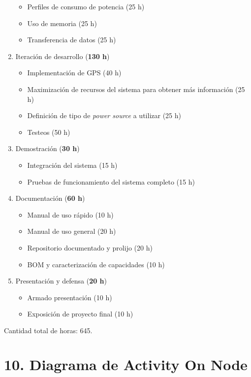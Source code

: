 \documentclass[
11pt, %
codirector, %
]{charter}
\begin{document}
\begin{enumerate}
\begin{itemize}
			\item Perfiles de consumo de potencia (25 h)
			\item Uso de memoria (25 h)
			\item Transferencia de datos (25 h)		
		\end{itemize}
	\item Iteración de desarrollo  (\textbf{130 h})
		\begin{itemize}
			\item Implementación de GPS (40 h)
			\item Maximización de recursos del sistema para obtener más información (25 h)
			\item Definición de tipo de \textit{power source} a utilizar (25 h)
			\item Testeos (50 h)		
		\end{itemize}
	\item Demostración (\textbf{30 h})
		\begin{itemize}
			\item Integración del sistema (15 h)
			\item Pruebas de funcionamiento del sistema completo (15 h)
		\end{itemize}
	\item Documentación (\textbf{60 h})
		\begin{itemize}
			\item Manual de uso rápido (10 h)
			\item Manual de uso general (20 h)
			\item Repositorio documentado y prolijo (20 h)
			\item BOM y caracterización de capacidades (10 h)
		\end{itemize}
	\item Presentación y defensa (\textbf{20 h})
		\begin{itemize}
			\item Armado presentación (10 h)
			\item Exposición de proyecto final (10 h)
		\end{itemize}	
\end{enumerate}

Cantidad total de horas: 645.

\section{10. Diagrama de Activity On Node}
\label{sec:AoN}
\end{document}
